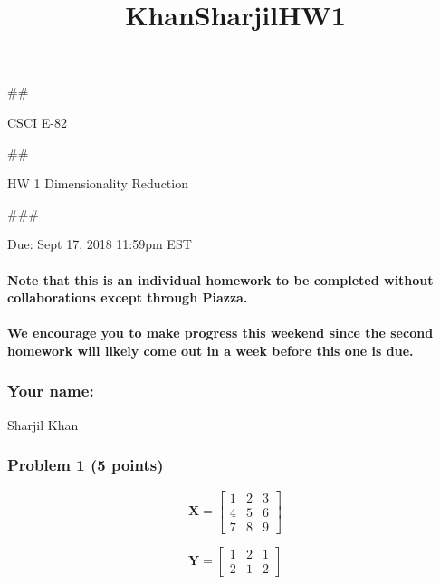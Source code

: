 \documentclass[11pt]{article}
\title{KhanSharjilHW1}
\begin{document}
    
    
    \maketitle
    
    

    
    \#\#

CSCI E-82

\#\#

HW 1 Dimensionality Reduction

\#\#\#

Due: Sept 17, 2018 11:59pm EST

\paragraph{Note that this is an individual homework to be completed
without collaborations except through
Piazza.}\label{note-that-this-is-an-individual-homework-to-be-completed-without-collaborations-except-through-piazza.}

\paragraph{We encourage you to make progress this weekend since the
second homework will likely come out in a week before this one is
due.}\label{we-encourage-you-to-make-progress-this-weekend-since-the-second-homework-will-likely-come-out-in-a-week-before-this-one-is-due.}

    \subsubsection{Your name:}\label{your-name}

    Sharjil Khan

    \subsubsection{Problem 1 (5 points)}\label{problem-1-5-points}

\[\mathbf{X} = \left[\begin{array}
{rrr}
1 & 2 & 3 \\
4 & 5 & 6 \\
7 & 8 & 9
\end{array}\right]
\]

\[\mathbf{Y} = \left[\begin{array}
{rrr}
1 & 2 & 1 \\
2 & 1 & 2  
\end{array}\right]
\]
\end{document}
